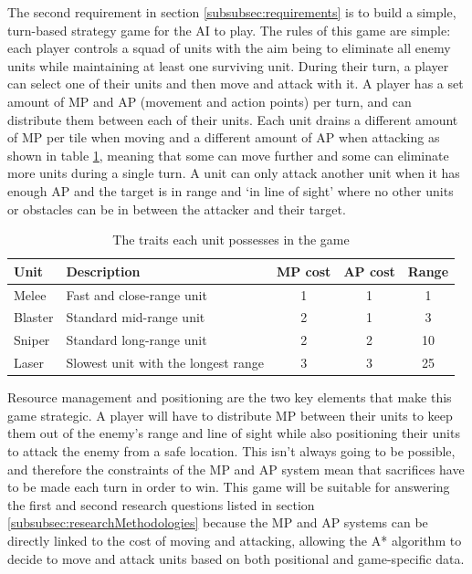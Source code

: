 \documentclass[11pt, a4paper]{article}
\begin{document}
The second requirement in section \ref{subsubsec:requirements} is to build a simple, turn-based strategy game for the AI to play. The rules of this game are simple: each player controls a squad of units with the aim being to eliminate all enemy units while maintaining at least one surviving unit. During their turn, a player can select one of their units and then move and attack with it. A player has a set amount of MP and AP (movement and action points) per turn, and can distribute them between each of their units. Each unit drains a different amount of MP per tile when moving and a different amount of AP when attacking as shown in table \ref{table:unitOverview}, meaning that some can move further and some can eliminate more units during a single turn. A unit can only attack another unit when it has enough AP and the target is in range and `in line of sight' where no other units or obstacles can be in between the attacker and their target.

\begin{table}[!h]
  \centering
  \begin{tabular}{ | l | p{6cm} | c | c | c |}
    \hline
    \textbf{Unit} & \textbf{Description} & \textbf{MP cost} & \textbf{AP cost} & \textbf{Range} \\ \hline
    Melee & Fast and close-range unit & 1 & 1 & 1 \\ \hline
    Blaster & Standard mid-range unit & 2 & 1 & 3 \\ \hline
    Sniper & Standard long-range unit & 2 & 2 & 10 \\ \hline
    Laser & Slowest unit with the longest range & 3 & 3 & 25 \\ 
    \hline
  \end{tabular}
  \caption{The traits each unit possesses in the game}
  \label{table:unitOverview}
\end{table}

Resource management and positioning are the two key elements that make this game strategic. A player will have to distribute MP between their units to keep them out of the enemy's range and line of sight while also positioning their units to attack the enemy from a safe location. This isn't always going to be possible, and therefore the constraints of the MP and AP system mean that sacrifices have to be made each turn in order to win. This game will be suitable for answering the first and second research questions listed in section \ref{subsubsec:researchMethodologies} because the MP and AP systems can be directly linked to the cost of moving and attacking, allowing the A* algorithm to decide to move and attack units based on both positional and game-specific data.
\end{document}
